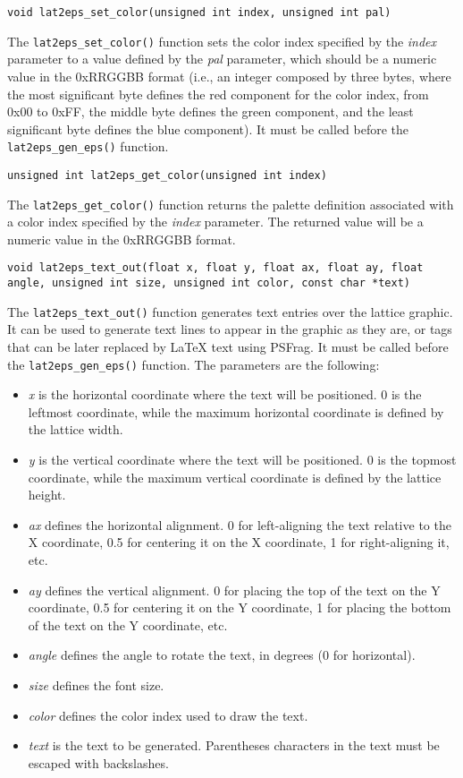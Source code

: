 \documentclass[a4paper]{article}
\begin{document}
\texttt{void lat2eps\_set\_color(unsigned int index, unsigned int pal)}
\bigbreak

The \texttt{lat2eps\_set\_color()} function sets the color index specified by the \textit{index} parameter to a value defined by the \textit{pal} parameter, which should be a numeric value in the 0xRRGGBB format (i.e., an integer composed by three bytes, where the most significant byte defines the red component for the color index, from 0x00 to 0xFF, the middle byte defines the green component, and the least significant byte defines the blue component). It must be called before the \texttt{lat2eps\_gen\_eps()} function.
\bigbreak\bigbreak


\texttt{unsigned int lat2eps\_get\_color(unsigned int index)}
\bigbreak

The \texttt{lat2eps\_get\_color()} function returns the palette definition associated with a color index specified by the \textit{index} parameter. The returned value will be a numeric value in the 0xRRGGBB format.
\bigbreak\bigbreak


\texttt{void lat2eps\_text\_out(float x, float y, float ax, float ay, float angle, unsigned int size, unsigned int color, const char *text)}
\bigbreak

The \texttt{lat2eps\_text\_out()} function generates text entries over the lattice graphic. It can be used to generate text lines to appear in the graphic as they are, or tags that can be later replaced by LaTeX text using PSFrag. It must be called before the \texttt{lat2eps\_gen\_eps()} function. The parameters are the following:

\begin{itemize}
  \item \textit{x} is the horizontal coordinate where the text will be positioned. 0 is the leftmost coordinate, while the maximum horizontal coordinate is defined by the lattice width.
  \item \textit{y} is the vertical coordinate where the text will be positioned. 0 is the topmost coordinate, while the maximum vertical coordinate is defined by the lattice height.
  \item \textit{ax} defines the horizontal alignment. 0 for left-aligning the text relative to the X coordinate, 0.5 for centering it on the X coordinate, 1 for right-aligning it, etc.
  \item \textit{ay} defines the vertical alignment. 0 for placing the top of the text on the Y coordinate, 0.5 for centering it on the Y coordinate, 1 for placing the bottom of the text on the Y coordinate, etc.
  \item \textit{angle} defines the angle to rotate the text, in degrees (0 for horizontal).
  \item \textit{size} defines the font size.
  \item \textit{color} defines the color index used to draw the text.
  \item \textit{text} is the text to be generated. Parentheses characters in the text must be escaped with backslashes.
\end{itemize} 
\bigbreak\bigbreak
\end{document}
